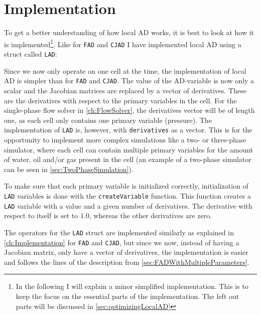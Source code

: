 \section{Implementation}
\label{sec:LADImplementation}
To get a better understanding of how local AD works, it is best to look at how it is implemented\footnote{In the following I will explain a minor simplified implementation. This is to keep the focus on the essential parts of the implementation. The left out parts will be discussed in \autoref{sec:optimizingLocalAD}}. Like for \texttt{FAD} and \texttt{CJAD} I have implemented local AD using a struct called \texttt{LAD}:

Since we now only operate on one cell at the time, the implementation of local AD is simpler than for \texttt{FAD} and \texttt{CJAD}. The value of the AD-variable is now only a scalar and the Jacobian matrices are replaced by a vector of derivatives. These are the derivatives  with respect to the primary variables in the cell. For the single-phase flow solver in \autoref{ch:FlowSolver}, the derivatives vector will be of length one, as each cell only contains one primary variable (pressure). The implementation of \texttt{LAD} is, however, with \texttt{derivatives} as a vector. This is for the opportunity to implement more complex simulations like a two- or three-phase simulator, where each cell can contain multiple primary variables for the amount of water, oil and/or gas present in the cell (an example of a two-phase simulator can be seen in \autoref{sec:TwoPhaseSimulation}).

To make sure that each primary variable is initialized correctly, initialization of \texttt{LAD} variables is done with the \texttt{createVariable} function. This function creates a \texttt{LAD} variable with a value and a given number of derivatives. The derivative with respect to itself is set to $1.0$, whereas the other derivatives are zero.

The operators for the \texttt{LAD} struct are implemented similarly as explained in \autoref{ch:Implementation} for \texttt{FAD} and \texttt{CJAD}, but since we now, instead of having a Jacobian matrix, only have a vector of derivatives, the implementation is easier and follows the lines of the description from \autoref{sec:FADWithMultipleParameters}. 

